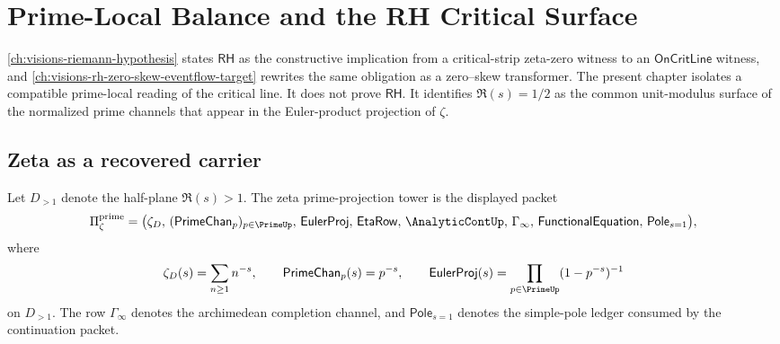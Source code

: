 \chapter{Prime-Local Balance and the RH Critical Surface}
\label{ch:visions-rh-prime-unitary-balance-surface}

\autoref{ch:visions-riemann-hypothesis} states $\mathsf{RH}$ as the
constructive implication from a critical-strip zeta-zero witness to an
$\mathsf{OnCritLine}$ witness, and
\autoref{ch:visions-rh-zero-skew-eventflow-target} rewrites the same
obligation as a zero--skew transformer.  The present chapter isolates a
compatible prime-local reading of the critical line.  It does not prove
$\mathsf{RH}$.  It identifies $\Re(s)=1/2$ as the common unit-modulus
surface of the normalized prime channels that appear in the Euler-product
projection of $\zeta$.

\section{Zeta as a recovered carrier}
\label{sec:rh-zeta-recovered-carrier}

\begin{definition}
\label{def:rh-zeta-prime-projection-tower}
Let $D_{>1}$ denote the half-plane $\Re(s)>1$.  The zeta
prime-projection tower is the displayed packet
$$
\Pi_{\zeta}^{\mathrm{prime}}
=
\bigl(
\zeta_D,\,
(\mathsf{PrimeChan}_p)_{p\in\PrimeUp},\,
\mathsf{EulerProj},\,
\mathsf{EtaRow},\,
\AnalyticContUp,\,
\Gamma_{\infty},\,
\mathsf{FunctionalEquation},\,
\mathsf{Pole}_{s=1}
\bigr),
$$
where
$$
\zeta_D(s)=\sum_{n\geq 1}n^{-s},
\qquad
\mathsf{PrimeChan}_p(s)=p^{-s},
\qquad
\mathsf{EulerProj}(s)=\prod_{p\in\PrimeUp}(1-p^{-s})^{-1}
$$
on $D_{>1}$.  The row $\Gamma_{\infty}$ denotes the archimedean completion
channel, and $\mathsf{Pole}_{s=1}$ denotes the simple-pole ledger consumed by
the continuation packet.
\end{definition}

